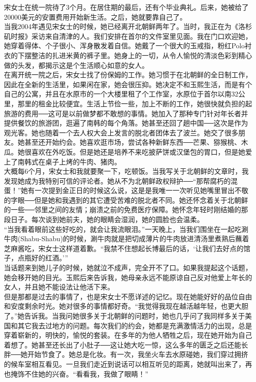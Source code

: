 宋女士在统一院待了3个月。在居住期的最后，还有个毕业典礼。后来，她被给了20000美元的安置费用开始新生活。之后，她就要靠自己了。\\

当我2004年遇见宋女士的时候，她已经离开北朝鲜两年了。当时，我正在为《洛杉矶时报》采访来自清津的人。我们安排在首尔的文件室里见面。我在门口欢迎她，她穿着得体、个子很小、浑身散发着自信。她戴了一个很大的玉戒指，粉红Polo衬衣的下摆整洁的扎进米黄的裤子里。她身上的一切，从令人愉悦的清淡色彩到精心做的头发，都揭示这是个生活顺心如意的女人。\\

在离开统一院之后，宋女士找了份保姆的工作。她习惯于在北朝鲜的全日制工作，因此在全新的生活里，如果闲在家，她会很压抑。她决定不和玉熙生活，而是有个自己的公寓，并且在水原市的一个大楼里租了个工作室，水原位于首尔以南32公里，那里的租金比较便宜。生活上节俭一些，加上不断的工作，她很快就负担的起旅游的费用──这可是以前做梦都不敢想的事情。她加入了那种专门针对年长者并提供餐饮的旅游团，逛遍了南韩的每个角落。她甚至还回了趟中国──这次是作为观光客。她也随着一个去人权大会上发言的脱北者团体去了波兰。她交了很多朋友。她甚至还开始约会。她喜欢逛市场，尝试各种新鲜东西──芒果、猕猴桃、木瓜。她很喜欢在外吃饭。但是她还是培养不来吃披萨饼或汉堡包的胃口，但是她爱上了南韩式在桌子上烤的牛肉、猪肉。\\

大概每6个月，宋女士和我就要聚一下，吃顿饭。当我写关于北朝鲜的文章时，我发现她成为我特别可信的评论者。她从不为北朝鲜政权辩护──“那帮腐朽的混蛋！”她有一次提到金正日的时候这么说，这是是我唯一一次听见她嘴里冒出不敬的字眼──但是她和我遇到的其它遭受苦难的脱北者不同。她还怀念着关于北朝鲜的一些──邻里之间的友情；崩溃之前的免费医疗保障。她怀念年轻时刚结婚的那段日子。每次谈到她前夫，她的眼睛会湿润，她的圆脸也会温柔。\\

“当我看着眼前这些好吃的，就会让我流眼泪。”一天晚上，当我们围坐在一起吃涮牛肉(Shabu-Shabu)的时候，涮牛肉就是把切成薄片的牛肉放进清汤里煮熟后蘸着芝麻酱吃，宋女士这样道着歉。“我禁不住想起长博最后的话，‘让我们去好点的馆子，点瓶好的红酒。’”\\

当话题来到她儿子的时候，她就泣不成声，完全开不了口。如果我提起这个话题，她会移开她的目光。玉熙后来告诉我，她母亲永远不能原谅自己反对他爱上年长的女人，并且她不能设法让他活下来。\\

但是那都是过去的事情了，也是宋女士不愿详述的记忆。现在她能好好的品位自由和安度剩余时光。她对很多的事情都好奇。“我觉得我现在越活越年轻，也更大胆了。”她告诉我。当我问她很多关于北朝鲜的问题时，她也几乎问了我同样多关于美国和其它我去过地方的问题。每次我们的约会，她都是充满激情活力的出现，总是穿着崭新的，明快的，愉悦的套装。在多年的为他人牺牲之后，现在她开始为自己着想了。她甚至还长出了小肚子──这让她大吃一惊，这么多年的匮乏之后还能长胖──她开始节食了。她总是化妆。有一次，我坐火车去水原碰她，我们穿过拥挤的候车室相互看见。一旦我们走近到说话可以相互听见的距离，她就叫出来了，再也掩饰不住她的兴奋。“看看我，我做了眼睛！”\\

